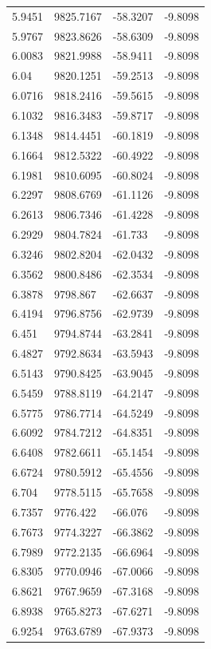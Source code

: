 \begin{table}[H]
\begin{tabular}{llll}
5.9451 & 9825.7167 & -58.3207 & -9.8098 \\
5.9767 & 9823.8626 & -58.6309 & -9.8098 \\
6.0083 & 9821.9988 & -58.9411 & -9.8098 \\
6.04 & 9820.1251 & -59.2513 & -9.8098 \\
6.0716 & 9818.2416 & -59.5615 & -9.8098 \\
6.1032 & 9816.3483 & -59.8717 & -9.8098 \\
6.1348 & 9814.4451 & -60.1819 & -9.8098 \\
6.1664 & 9812.5322 & -60.4922 & -9.8098 \\
6.1981 & 9810.6095 & -60.8024 & -9.8098 \\
6.2297 & 9808.6769 & -61.1126 & -9.8098 \\
6.2613 & 9806.7346 & -61.4228 & -9.8098 \\
6.2929 & 9804.7824 & -61.733 & -9.8098 \\
6.3246 & 9802.8204 & -62.0432 & -9.8098 \\
6.3562 & 9800.8486 & -62.3534 & -9.8098 \\
6.3878 & 9798.867 & -62.6637 & -9.8098 \\
6.4194 & 9796.8756 & -62.9739 & -9.8098 \\
6.451 & 9794.8744 & -63.2841 & -9.8098 \\
6.4827 & 9792.8634 & -63.5943 & -9.8098 \\
6.5143 & 9790.8425 & -63.9045 & -9.8098 \\
6.5459 & 9788.8119 & -64.2147 & -9.8098 \\
6.5775 & 9786.7714 & -64.5249 & -9.8098 \\
6.6092 & 9784.7212 & -64.8351 & -9.8098 \\
6.6408 & 9782.6611 & -65.1454 & -9.8098 \\
6.6724 & 9780.5912 & -65.4556 & -9.8098 \\
6.704 & 9778.5115 & -65.7658 & -9.8098 \\
6.7357 & 9776.422 & -66.076 & -9.8098 \\
6.7673 & 9774.3227 & -66.3862 & -9.8098 \\
6.7989 & 9772.2135 & -66.6964 & -9.8098 \\
6.8305 & 9770.0946 & -67.0066 & -9.8098 \\
6.8621 & 9767.9659 & -67.3168 & -9.8098 \\
6.8938 & 9765.8273 & -67.6271 & -9.8098 \\
6.9254 & 9763.6789 & -67.9373 & -9.8098 \\

\end{tabular}
\end{table}

